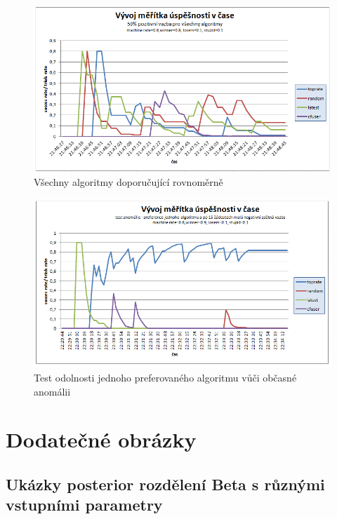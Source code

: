 \documentclass[thesis=M,czech]{FITthesis}[2014/05/07]
\begin{document}
\begin{figure}\centering
	\includegraphics[width=1.0\textwidth]{obr/experimenty/test7.png}
 	\caption[Všechny algoritmy doporučující rovnoměrně]{Všechny algoritmy doporučující rovnoměrně}\label{fig:test7}
\end{figure}	

\begin{figure}\centering
	\includegraphics[width=1.0\textwidth]{obr/experimenty/test9_1.png}
 	\caption[Test odolnosti jednoho preferovaného algoritmu vůči občasné anomálii]{Test odolnosti jednoho preferovaného algoritmu vůči občasné anomálii}\label{fig:test9_1}
\end{figure}	

\chapter{Dodatečné obrázky}
\section{Ukázky posterior rozdělení Beta s různými vstupními parametry}
\end{document}
